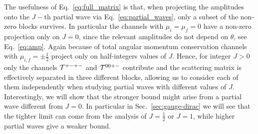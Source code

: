 \documentclass[a4paper,11pt]{article}
\begin{document}
The usefulness of Eq.~\eqref{eq:full_matrix} is that, when projecting the amplitudes onto the $J-$th partial wave via Eq.~\eqref{eq:partial_waves}, only a subset of the non-zero blocks survives. In particular the channels with $\mu_i=\mu_f=0$ have a non-zero projection only on $J=0$, since the relevant amplitudes do not depend on $\theta$, see Eq.~\eqref{eq:amp}. 
Again because of total angular momentum conservation channels with $\mu_{i,f}=\pm \frac{1}{2}$ project only on half-integers values of $J$. Hence, for integer $J>0$ only the channels ${\cal T}^{+-+-}$ and ${\cal T}^{00+-}$ contribute and the scattering matrix is effectively separated in three different blocks, allowing us to consider each of them independently when studying partial waves with different values of $J$. 
Interestingly, we will show that the stronger bound might arise from a partial wave different from $J=0$. In particular in Sec.~\ref{sec:gauge-dirac} we will see that the tighter limit can come from the analysis of $J=\frac{1}{2}$ or $J=1$, while higher partial waves give a weaker bound.
\end{document}
